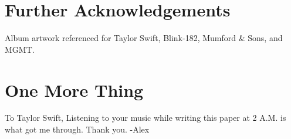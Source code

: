 \documentclass[conference]{IEEEtran}
\begin{document}
\section*{Further Acknowledgements}
Album artwork referenced for Taylor Swift, Blink-182, Mumford \& Sons, and MGMT.
\pagebreak
\section*{One More Thing}
To Taylor Swift,
\newline
\newline
Listening to your music while writing this paper at 2 A.M. 
is what got me through. 
\newline
\newline
Thank you.
\newline
\newline
-Alex
\end{document}
